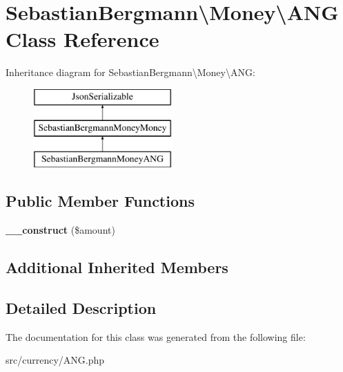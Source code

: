 \hypertarget{classSebastianBergmann_1_1Money_1_1ANG}{}\section{Sebastian\+Bergmann\textbackslash{}Money\textbackslash{}A\+N\+G Class Reference}
\label{classSebastianBergmann_1_1Money_1_1ANG}
Inheritance diagram for Sebastian\+Bergmann\textbackslash{}Money\textbackslash{}A\+N\+G\+:\begin{figure}[H]
\begin{center}
\leavevmode
\includegraphics[height=3.000000cm]{classSebastianBergmann_1_1Money_1_1ANG}
\end{center}
\end{figure}
\subsection*{Public Member Functions}
\begin{DoxyCompactItemize}
\item 
\hypertarget{classSebastianBergmann_1_1Money_1_1ANG_af261da4af53dc5e0f3e4f7d2b8a99e5f}{}{\bfseries \+\_\+\+\_\+construct} (\$amount)\label{classSebastianBergmann_1_1Money_1_1ANG_af261da4af53dc5e0f3e4f7d2b8a99e5f}

\end{DoxyCompactItemize}
\subsection*{Additional Inherited Members}


\subsection{Detailed Description}


The documentation for this class was generated from the following file\+:\begin{DoxyCompactItemize}
\item 
src/currency/A\+N\+G.\+php\end{DoxyCompactItemize}
